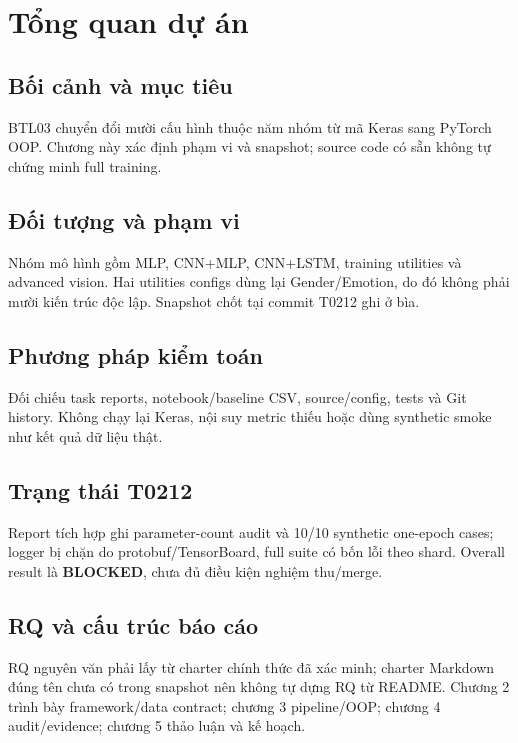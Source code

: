 \chapter{Tổng quan dự án}

\section{Bối cảnh và mục tiêu}
BTL03 chuyển đổi mười cấu hình thuộc năm nhóm từ mã Keras sang PyTorch OOP. Chương này xác định phạm vi và snapshot; source code có sẵn không tự chứng minh full training.

\section{Đối tượng và phạm vi}
Nhóm mô hình gồm MLP, CNN+MLP, CNN+LSTM, training utilities và advanced vision. Hai utilities configs dùng lại Gender/Emotion, do đó không phải mười kiến trúc độc lập. Snapshot chốt tại commit T0212 ghi ở bìa.

\section{Phương pháp kiểm toán}
Đối chiếu task reports, notebook/baseline CSV, source/config, tests và Git history. Không chạy lại Keras, nội suy metric thiếu hoặc dùng synthetic smoke như kết quả dữ liệu thật.

\section{Trạng thái T0212}
Report tích hợp ghi parameter-count audit và 10/10 synthetic one-epoch cases; logger bị chặn do protobuf/TensorBoard, full suite có bốn lỗi theo shard. Overall result là \textbf{BLOCKED}, chưa đủ điều kiện nghiệm thu/merge.

\section{RQ và cấu trúc báo cáo}
RQ nguyên văn phải lấy từ charter chính thức đã xác minh; charter Markdown đúng tên chưa có trong snapshot nên không tự dựng RQ từ README. Chương 2 trình bày framework/data contract; chương 3 pipeline/OOP; chương 4 audit/evidence; chương 5 thảo luận và kế hoạch.